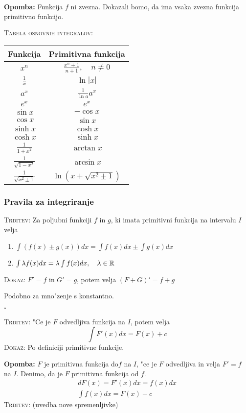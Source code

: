 \textbf{Opomba:} Funkcija $f$ ni zvezna. Dokazali bomo, da ima vsaka zvezna funkcija primitivno funkcijo.

\textsc{Tabela osnovnih integralov:}
\begin{table}[!htbp]
	\centering
	\begin{tabular}{c | c}
		\textbf{Funkcija} & \textbf{Primitivna funkcija} \\ \hline
		$x^n$ & $\frac{x^n+1}{n + 1}, \quad n \neq 0$ \\
		$\frac{1}{x}$ & $\ln |x|$ \\
		$a^x$ & $\frac{1}{\ln a} a^x$ \\
		$e^x$ & $e^x$ \\
		$\sin x$ & $- \cos x$ \\
		$\cos x$ & $\sin x$ \\
		$\sinh x$ & $\cosh x$ \\
		$\cosh x$ & $\sinh x$ \\
		$\frac{1}{1+x^2}$ & $\arctan x$ \\
		$\frac{1}{\sqrt{1 - x^2}}$ & $\arcsin x$ \\
		$\frac{1}{\sqrt{x^2 \pm 1}}$ & $\ln (x + \sqrt{x^2 \pm 1})$
	\end{tabular}
\end{table}
%
\subsubsection{Pravila za integriranje}
\textsc{Trditev:} Za poljubni funkciji $f$ in $g$, ki imata primitivni funkcija na intervalu $I$ velja
\begin{enumerate}
	\item $\int (f(x) \pm g(x)) dx = \int f(x) dx \pm \int g(x) dx$
	\item $\int \lambda f(x) dx = \lambda \int f(x) dx, \quad \lambda \in \mathbb{R}$
\end{enumerate}
\textsc{Dokaz:} $F' = f$ in $G' = g$, potem velja $(F + G)' = f + g$

Podobno za mno"zenje s konstantno.

\hfill $\square$

\textsc{Trditev:} "Ce je $F$ odvedljiva funkcija na $I$, potem velja
\begin{equation*}
\int F'(x)dx = F(x) + c
\end{equation*}
\textsc{Dokaz:} Po definiciji primitivne funkcije.

\textbf{Opomba:} $F$ je primitivna funkcija do$f$ na $I$, "ce je $F$ odvedljiva in velja $F' = f$ na $I$. Denimo, da je $F$ primitivna funkcija od $f$.
\begin{gather*}
dF(x) = F'(x)dx = f(x)dx \\
\int f(x)dx = F(x) + c
\end{gather*}
%
\textsc{Trditev:} (uvedba nove spremenljivke)

